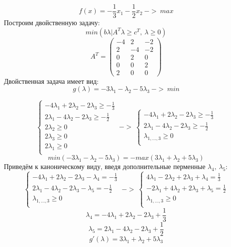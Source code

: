 \documentclass{article}
\begin{document}
\[f(x) = -\frac{1}{3}x_1 - \frac{1}{2}x_2\ ->\ max\]
Построим двойственную задачу: 
\[min(b\lambda | A^T \lambda \geq c^T,\ \lambda \geq 0)\]
\[A^T = \begin{pmatrix}
    -4&2&-2\\
    2&-4&-2\\
    0&2&0\\
    0&0&2\\
    2&0&0
\end{pmatrix}\]
Двойственная задача имеет вид:
\[g(\lambda) = -3\lambda_1 - \lambda_2 - 5\lambda_3\ ->\ min\]

\[\begin{cases}
    -4\lambda_1 + 2\lambda_2 -2\lambda_3 \geq -\frac{1}{3}\\
    2\lambda_1 -4\lambda_2 -2\lambda_3 \geq -\frac{1}{2}\\
    2\lambda_2 \geq 0\\
    2\lambda_3 \geq 0\\
    2\lambda_1 \geq 0\\
\end{cases}\ ->\ 
\begin{cases}
    -4\lambda_1 + 2\lambda_2 -2\lambda_3 \geq -\frac{1}{3}\\
    2\lambda_1 -4\lambda_2 -2\lambda_3 \geq -\frac{1}{2}\\
    \lambda_{1, ..., 3} \geq 0\\
\end{cases}
\]
\[min(-3\lambda_1 - \lambda_2 - 5\lambda_3) = - max(3\lambda_1 + \lambda_2 + 5\lambda_3)\]
Приведём к каноническому виду, введя дополнительные перменные $\lambda_4,\ \lambda_5$:
\[
\begin{cases}
    -4\lambda_1 + 2\lambda_2 -2\lambda_3 - \lambda_4 = -\frac{1}{3}\\
    2\lambda_1 -4\lambda_2 -2\lambda_3 - \lambda_5 = -\frac{1}{2}\\
    \lambda_{1, ..., 3} \geq 0\\
\end{cases}
\ ->\ 
\begin{cases}
    4\lambda_1 - 2\lambda_2 + 2\lambda_3 + \lambda_4 = \frac{1}{3}\\
    - 2\lambda_1 + 4\lambda_2 + 2\lambda_3 + \lambda_5 = \frac{1}{2}\\
    \lambda_{1, ..., 3} \geq 0\\
\end{cases}
\]
\[\lambda_4 = -4\lambda_1 + 2\lambda_2 - 2\lambda_3 + \frac{1}{3}\]
\[ \lambda_5 =  2\lambda_1 - 4\lambda_2 - 2\lambda_3 +\frac{1}{2}\]
\[g'(\lambda) = 3\lambda_1 + \lambda_2 + 5\lambda_3\]
\end{document}
